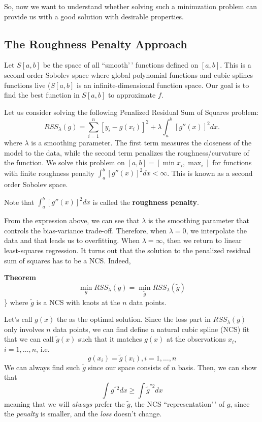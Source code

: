 \documentclass[
]{book}
\begin{document}
So, now we want to understand whether solving such a minimzation problem can provide us with a good solution with desirable properties.

\subsection{The Roughness Penalty Approach}\label{the-roughness-penalty-approach}

Let \(S[a,b]\) be the space of all ``smooth'\,' functions defined on \([a,b]\). This is a second order Sobolev space where global polynomial functions and cubic splines functions live (\(S[a,b]\) is an infinite-dimensional function space. Our goal is to find the best function in \(S[a,b]\) to approximate \(f\).

Let us consider solving the following Penalized Residual Sum of Squares problem:
\[
RSS_\lambda(g) = \sum_{i=1}^n [y_i - g(x_i)]^2  + \lambda \int_a^b [g''(x)]^2 dx.
\]
where \(\lambda\) is a smoothing parameter. The first term measures the closeness of the model to the data, while the second term penalizes the roughness/curvature of the function. We solve this problem on \([a,b]=[\min x_i, \max _i]\) for functions with finite roughness penalty \(\int_a^b [g''(x)]^2 dx < \infty\). This is known as a second order Sobolev space.

Note that \(\int_a^b [g''(x)]^2 dx\) is called the \textbf{roughness penalty}.

From the expression above, we can see that \(\lambda\) is the smoothing parameter that controls the bias-variance trade-off. Therefore, when \(\lambda=0\), we interpolate the data and that leads us to overfitting. When \(\lambda=\infty\), then we return to linear least-squares regression. It turns out that the solution to the penalized residual sum of squares has to be a NCS. Indeed,

\textbf{Theorem}
\[\min_g RSS_{\lambda}(g) = \min_{\tilde{g}} RSS_{\lambda}(\tilde{g}) \]\}
where \(\tilde{g}\) is a NCS with knots at the \(n\) data points.

Let's call \(g(x)\) the as the optimal solution. Since the loss part in \(RSS_\lambda(g)\) only involves \(n\) data points, we can find define a natural cubic spline (NCS) fit that we can call \(\tilde{g}(x)\) such that it matches \(g(x)\) at the observations \(x_i\), \(i=1, \ldots, n\), i.e.
\[g(x_i) = \tilde{g}(x_i), i=1, \ldots, n\]
We can always find such \(\tilde{g}\) since our space consists of \(n\) basis. Then, we can show that
\[\int g^{''2} dx \geq \int  \tilde{g}^{''2} dx\]
meaning that we will \emph{always} prefer the \(\tilde{g}\), the NCS ``representation'\,' of
\(g\), since the \emph{penalty} is smaller, and the \emph{loss} doesn't change.
\end{document}
